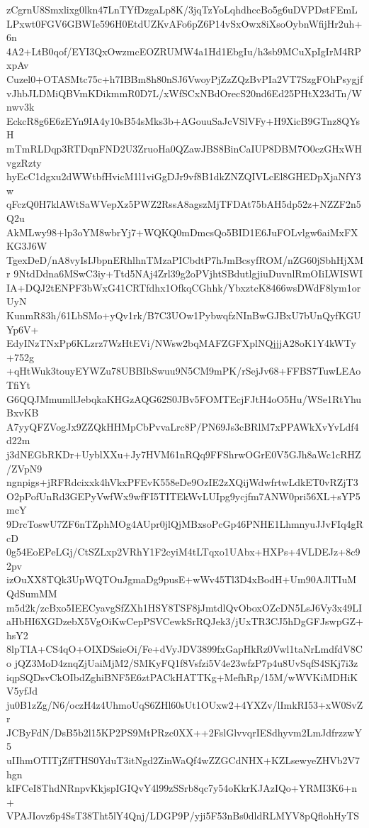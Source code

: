 zCgrnU8Smxlixg0lkn47LnTYfDzgaLp8K/3jqTzYoLqhdhccBo5g6uDVPDstFEmL
LPxwt0FGV6GBWIe596H0EtdUZKvAFo6pZ6P14vSxOwx8iXsoOybnWfijHr2uh+6n
4A2+LtB0qof/EYI3QxOwzmcEOZRUMW4a1Hd1EbgIu/h3sb9MCuXpIgIrM4RPxpAv
Cuzel0+OTASMtc75c+h7IBBm8h80nSJ6VwoyPjZzZQzBvPIa2VT7SzgFOhPsygjf
vJhbJLDMiQBVmKDikmmR0D7L/xWfSCxNBdOrecS20nd6Ed25PHtX23dTn/Wnwv3k
EckcR8g6E6zEYn9IA4y10sB54sMks3b+AGouuSaJcVSlVFy+H9XicB9GTnz8QYsH
mTmRLDqp3RTDqnFND2U3ZruoHa0QZawJBS8BinCaIUP8DBM7O0czGHxWHvgzRzty
hyEcC1dgxu2dWWtbfHvicM1l1viGgDJr9vf8B1dkZNZQIVLcEl8GHEDpXjaNfY3w
qFczQ0H7klAWtSaWVepXz5PWZ2RssA8agszMjTFDAt75bAH5dp52z+NZZF2n5Q2u
AkMLwy98+lp3oYM8wbrYj7+WQKQ0mDmcsQo5BID1E6JuFOLvlgw6aiMxFXKG3J6W
TgexDeD/nA8vyIsIJbpnERhlhnTMzaPICbdtP7hJmBcsyfROM/nZG60jSbhHjXMr
9NtdDdna6MSwC3iy+Ttd5NAj4Zrl39g2oPVjhtSBdutlgjiuDuvnlRmOIiLWISWI
IA+DQJ2tENPF3bWxG41CRTfdhx1OfkqCGhhk/YbxztcK8466wsDWdF8lym1orUyN
KunmR83h/61LbSMo+yQv1rk/B7C3UOw1PybwqfzNInBwGJBxU7bUnQyfKGUYp6V+
EdyINzTNxPp6KLzrz7WzHtEVi/NWsw2bqMAFZGFXplNQjjjA28oK1Y4kWTy+752g
+qHtWuk3touyEYWZu78UBBIbSwuu9N5CM9mPK/rSejJv68+FFBS7TuwLEAoTfiYt
G6QQJMmumllJebqkaKHGzAQG62S0JBv5FOMTEcjFJtH4oO5Hu/WSe1RtYhuBxvKB
A7yyQFZVogJx9ZZQkHHMpCbPvvaLrc8P/PN69Js3cBRlM7xPPAWkXvYvLdf4d22m
j3dNEGbRKDr+UyblXXu+Jy7HVM61nRQq9FFShrwOGrE0V5GJh8aWc1cRHZ/ZVpN9
ngnpigs+jRFRdcixxk4hVkxPFEvK558eDe9OzIE2zXQijWdwfrtwLdkET0vRZjT3
O2pPofUnRd3GEPyVwfWx9wfFI5TITEkWvLUIpg9ycjfm7ANW0pri56XL+sYP5mcY
9DrcToswU7ZF6nTZphMOg4AUpr0jlQjMBxsoPcGp46PNHE1LhmnyuJJvFIq4gRcD
0g54EoEPeLGj/CtSZLxp2VRhY1F2cyiM4tLTqxo1UAbx+HXPs+4VLDEJz+8c92pv
izOuXX8TQk3UpWQTOuJgmaDg9pusE+wWv45Tl3D4xBodH+Um90AJlTIuMQdSumMM
m5d2k/zcBxo5IEECyavgSfZXh1HSY8TSF8jJmtdlQvOboxOZcDN5LsJ6Vy3x49LI
aHbHI6XGDzebX5VgOiKwCepPSVCewkSrRQJek3/jUxTR3CJ5hDgGFJswpGZ+hsY2
8lpTIA+CS4qO+OIXDSsieOi/Fe+dVyJDV3899fxGapHkRz0Vwl1taNrLmdfdV8Co
jQZ3MoD4znqZjUaiMjM2/SMKyFQ1f8Vsfzi5V4e23wfzP7p4u8UvSqfS4SKj7i3z
iqpSQDsvCkOIbdZghiBNF5E6ztPACkHATTKg+MefhRp/15M/wWVKiMDHiKV5yfJd
ju0B1zZg/N6/oczH4z4UhmoUqS6ZHl60sUt1OUxw2+4YXZv/lImkRI53+xW0SvZr
JCByFdN/DsB5b2l15KP2PS9MtPRzc0XX++2FslGlvvqrIESdhyvm2LmJdfrzzwY5
uIIhmOTITjZffTHS0YduT3itNgd2ZinWaQf4wZZGCdNHX+KZLsewyeZHVb2V7hgn
kIFCeI8ThdNRnpvKkjspIGIQvY4l99zSSrb8qc7y54oKkrKJAzIQo+YRMI3K6+n+
VPAJIovz6p4SsT38Tht5lY4Qnj/LDGP9P/yji5F53nBs0dldRLMYV8pQflohHyTS
